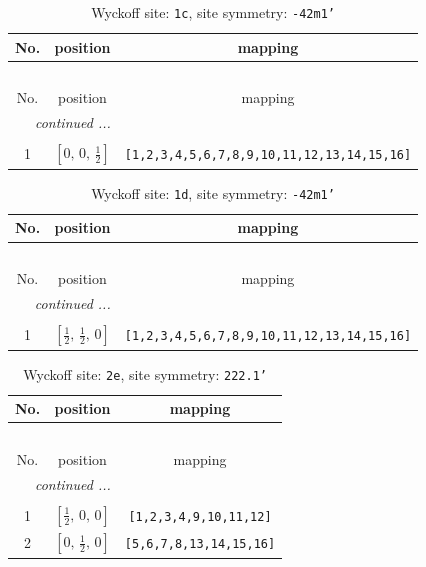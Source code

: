 \documentclass[fleqn,8pt]{jsarticle}
\begin{document}
\begin{longtable}{ccc}
\caption{Wyckoff site: {\tt 1c}, site symmetry: {\tt -42m1'}}
 \\
 \hline \hline
No. & position & mapping \\ \hline \endfirsthead

\multicolumn{2}{l}{\tablename\ \thetable{}} \\
 \hline \hline
No. & position & mapping \\ \hline \endhead

 \hline \hline
\multicolumn{2}{r}{\footnotesize\it continued ...} \\ \endfoot

 \hline \hline
\multicolumn{2}{r}{} \\ \endlastfoot

1 & $\left[ 0,\, 0,\, \frac{1}{2} \right]$ & {\tt [1,2,3,4,5,6,7,8,9,10,11,12,13,14,15,16]} \\
\end{longtable}
\renewcommand{\arraystretch}{1.2}
\begin{longtable}{ccc}
\caption{Wyckoff site: {\tt 1d}, site symmetry: {\tt -42m1'}}
 \\
 \hline \hline
No. & position & mapping \\ \hline \endfirsthead

\multicolumn{2}{l}{\tablename\ \thetable{}} \\
 \hline \hline
No. & position & mapping \\ \hline \endhead

 \hline \hline
\multicolumn{2}{r}{\footnotesize\it continued ...} \\ \endfoot

 \hline \hline
\multicolumn{2}{r}{} \\ \endlastfoot

1 & $\left[ \frac{1}{2},\, \frac{1}{2},\, 0 \right]$ & {\tt [1,2,3,4,5,6,7,8,9,10,11,12,13,14,15,16]} \\
\end{longtable}
\renewcommand{\arraystretch}{1.2}
\begin{longtable}{ccc}
\caption{Wyckoff site: {\tt 2e}, site symmetry: {\tt 222.1'}}
 \\
 \hline \hline
No. & position & mapping \\ \hline \endfirsthead

\multicolumn{2}{l}{\tablename\ \thetable{}} \\
 \hline \hline
No. & position & mapping \\ \hline \endhead

 \hline \hline
\multicolumn{2}{r}{\footnotesize\it continued ...} \\ \endfoot

 \hline \hline
\multicolumn{2}{r}{} \\ \endlastfoot

1 & $\left[ \frac{1}{2},\, 0,\, 0 \right]$ & {\tt [1,2,3,4,9,10,11,12]} \\ \hline
2 & $\left[ 0,\, \frac{1}{2},\, 0 \right]$ & {\tt [5,6,7,8,13,14,15,16]} \\
\end{longtable}
\end{document}
